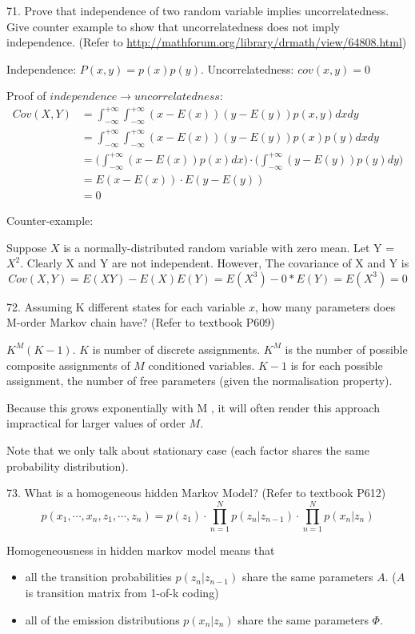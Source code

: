 \documentclass[11pt,a4paper]{article}
\newcommand{\infint}{\int_{-\infty}^{+\infty}}
\begin{document}
71. Prove that independence of two random variable implies uncorrelatedness. Give counter example to show that uncorrelatedness does not imply independence. (Refer to \url{http://mathforum.org/library/drmath/view/64808.html})

    Independence: $ P (x,y) = p(x) p(y) $.  Uncorrelatedness: $ cov (x,y) = 0 $

    Proof of $independence \rightarrow uncorrelatedness$:
    \begin{align}
        Cov(X,Y) &= \infint \infint (x - E(x))(y - E(y)) p(x,y) dx dy  \\
        &= \infint \infint (x - E(x))(y - E(y))  p(x)p(y) dx dy \\
        &= \big( \infint (x - E(x)) p(x) dx \big) \cdot \big( \infint (y - E(y)) p(y) dy \big) \\
        &=  E(x - E(x)) \cdot E(y - E(y)) \\
        &=  0 
    \end{align}

    Counter-example: 

    Suppose $X$ is a normally-distributed random variable with zero mean.  Let Y = $X^2$.  Clearly X and Y are not independent.
    However, The covariance of X and Y is
    $$ Cov(X,Y) = E(XY) - E(X)E(Y) = E(X^3) - 0*E(Y) = E(X^3)  = 0 $$

72. Assuming K different states for each variable $x$, how many parameters does M-order Markov chain have? (Refer to textbook P609)
    
$ K^M (K - 1)$. $K$ is number of discrete assignments. $K^M$ is the number of possible composite assignments of $M$ conditioned variables. $K-1$ is for each possible assignment, the number of free parameters (given the normalisation property).

 Because this grows exponentially with M , it will often render this approach impractical for larger values of order $M$.

 Note that we only talk about stationary case (each factor shares the same probability distribution).

 73. What is a homogeneous hidden Markov Model? (Refer to textbook P612)
    $$ p(x_1, \cdots, x_n, z_1, \cdots, z_n) = p(z_1) \cdot \prod_{n=1}^{N} p(z_n | z_{n-1}) \cdot \prod_{n=1}^{N} p(x_n | z_n) $$

    Homogeneousness in hidden markov model means that
    \begin{itemize}
        \item all the transition probabilities $p(z_n | z_{n-1})$ share the same parameters $A$. ($A$ is transition matrix from 1-of-k coding)
        \item all of the emission distributions $p(x_n | z_n)$ share the same parameters $\Phi$.
        \end{itemize}
\end{document}
